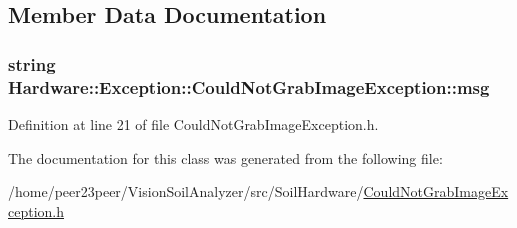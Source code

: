 \subsection{Member Data Documentation}
\hypertarget{class_hardware_1_1_exception_1_1_could_not_grab_image_exception_a3fe61759aec4ce332a968f49ced6b12a}{}
\subsubsection[{msg}]{\setlength{\rightskip}{0pt plus 5cm}string Hardware\+::\+Exception\+::\+Could\+Not\+Grab\+Image\+Exception\+::msg\hspace{0.3cm}{\ttfamily [private]}}\label{class_hardware_1_1_exception_1_1_could_not_grab_image_exception_a3fe61759aec4ce332a968f49ced6b12a}


Definition at line 21 of file Could\+Not\+Grab\+Image\+Exception.\+h.



The documentation for this class was generated from the following file\+:\begin{DoxyCompactItemize}
\item 
/home/peer23peer/\+Vision\+Soil\+Analyzer/src/\+Soil\+Hardware/\hyperlink{_could_not_grab_image_exception_8h}{Could\+Not\+Grab\+Image\+Exception.\+h}\end{DoxyCompactItemize}
